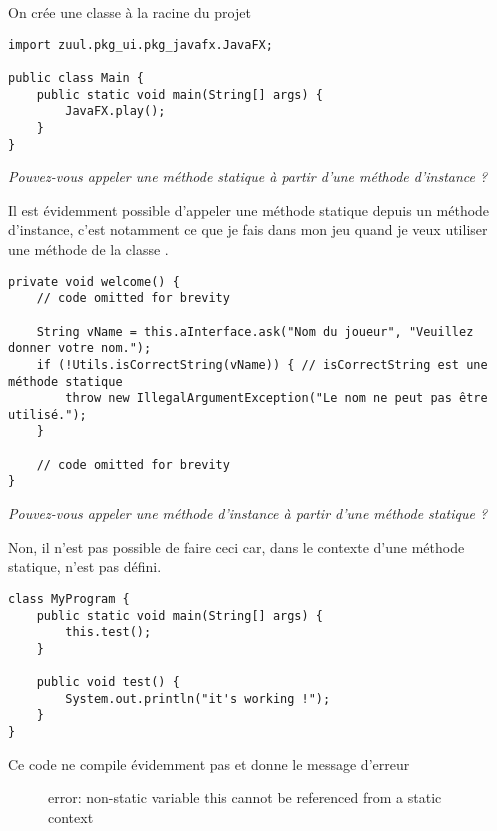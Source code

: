 \begin{exercise}[subtitle=Main]

On crée une classe  à la racine du projet

\begin{verbatim}
import zuul.pkg_ui.pkg_javafx.JavaFX;

public class Main {
    public static void main(String[] args) {
        JavaFX.play();
    }
}
\end{verbatim}
\end{exercise}

\setcounter{exercise}{55}

\begin{exercise}[subtitle=test static]

\textit{Pouvez-vous appeler une méthode statique à partir d'une méthode d'instance ?}

Il est évidemment possible d'appeler une méthode statique depuis un méthode d'instance, c'est notamment ce que je fais dans mon jeu quand je veux utiliser une méthode de la classe .

\begin{verbatim}
private void welcome() {
    // code omitted for brevity

    String vName = this.aInterface.ask("Nom du joueur", "Veuillez donner votre nom.");
    if (!Utils.isCorrectString(vName)) { // isCorrectString est une méthode statique
        throw new IllegalArgumentException("Le nom ne peut pas être utilisé.");
    }

    // code omitted for brevity
}
\end{verbatim}

\textit{Pouvez-vous appeler une méthode d'instance à partir d'une méthode statique ?}

Non, il n'est pas possible de faire ceci car, dans le contexte d'une méthode statique,  n'est pas défini.

\begin{verbatim}
class MyProgram {
    public static void main(String[] args) {
        this.test();
    }

    public void test() {
        System.out.println("it's working !");
    }
}
\end{verbatim}

Ce code ne compile évidemment pas et donne le message d'erreur

\begin{figure}[h]
  \centering
  error: non-static variable this cannot be referenced from a static context
\end{figure}


\end{exercise}
